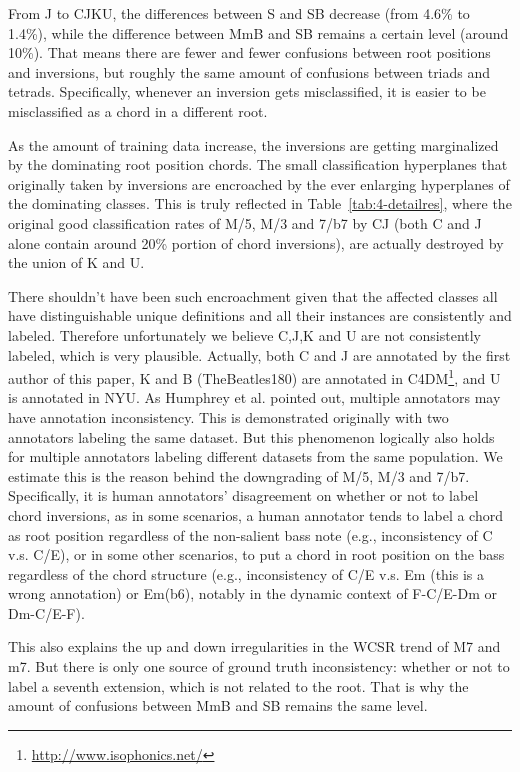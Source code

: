 From J to CJKU, the differences between S and SB decrease (from 4.6\% to 1.4\%), while the difference between MmB and SB remains a certain level (around 10\%). That means there are fewer and fewer confusions between root positions and inversions, but roughly the same amount of confusions between triads and tetrads. Specifically, whenever an inversion gets misclassified, it is easier to be misclassified as a chord in a different root.

As the amount of training data increase, the inversions are getting marginalized by the dominating root position chords. The small classification hyperplanes that originally taken by inversions are encroached by the ever enlarging hyperplanes of the dominating classes. This is truly reflected in Table~\ref{tab:4-detailres}, where the original good classification rates of M/5, M/3 and 7/b7 by CJ (both C and J alone contain around 20\% portion of chord inversions), are actually destroyed by the union of K and U.

There shouldn't have been such encroachment given that the affected classes all have distinguishable unique definitions and all their instances are consistently and labeled. Therefore unfortunately we believe C,J,K and U are not consistently labeled, which is very plausible. Actually, both C and J are annotated by the first author of this paper, K and B (TheBeatles180) are annotated in C4DM\footnote{\url{http://www.isophonics.net/}}, and U is annotated in NYU. As Humphrey et al. \cite{humphreyfour} pointed out, multiple annotators may have annotation inconsistency. This is demonstrated originally with two annotators labeling the same dataset. But this phenomenon logically also holds for multiple annotators labeling different datasets from the same population. We estimate this is the reason behind the downgrading of M/5, M/3 and 7/b7. Specifically, it is human annotators' disagreement on whether or not to label chord inversions, as in some scenarios, a human annotator tends to label a chord as root position regardless of the non-salient bass note (e.g., inconsistency of C v.s. C/E), or in some other scenarios, to put a chord in root position on the bass regardless of the chord structure (e.g., inconsistency of C/E v.s. Em (this is a wrong annotation) or Em(b6), notably in the dynamic context of F-C/E-Dm or Dm-C/E-F).

This also explains the up and down irregularities in the WCSR trend of M7 and m7. But there is only one source of ground truth inconsistency: whether or not to label a seventh extension, which is not related to the root. That is why the amount of confusions between MmB and SB remains the same level.

